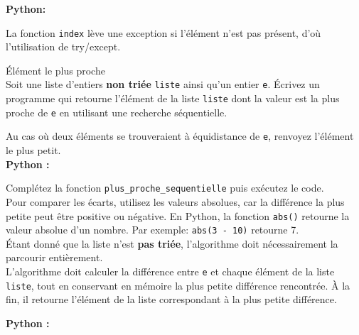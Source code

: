 \begin{Exercice}[20 minutes] [Python]
    \begin{solution}
        \textbf{Python:}
        
        La fonction \lstinline[language=python]|index| lève une exception si l'élément n'est pas présent, d'où l'utilisation de try/except.
    \end{solution}
    
    \end{Exercice}
    
    \begin{Exercice}[10 minutes] [Python] Élément le plus proche \\
    
    Soit une liste d'entiers \textbf{non triée} \texttt{liste} ainsi qu'un entier \texttt{e}. Écrivez un programme qui retourne l'élément de la liste \lstinline{liste} dont la valeur est la plus proche de \texttt{e} en utilisant une recherche séquentielle.\\
    \begin{exemple}
        
    \end{exemple}
    Au cas où deux éléments se trouveraient à équidistance de \lstinline{e}, renvoyez l'élément le plus petit.\\
    
    \textbf{Python :}
        
        \begin{conseil}
        Complétez la fonction \texttt{plus\_proche\_sequentielle} puis exécutez le code. \\

        Pour comparer les écarts, utilisez les valeurs absolues, car la différence la plus petite peut être positive ou négative. En Python, la fonction \lstinline{abs()} retourne la valeur absolue d'un nombre. Par exemple: \lstinline{abs(3 - 10)} retourne 7.\\

        Étant donné que la liste n'est \textbf{pas triée}, l'algorithme doit nécessairement la parcourir entièrement. \\

        L'algorithme doit calculer la différence entre \texttt{e} et chaque élément de la liste \texttt{liste}, tout en conservant en mémoire la plus petite différence rencontrée. À la fin, il retourne l'élément de la liste correspondant à la plus petite différence.
        \end{conseil}
        
        \begin{solution}
        \textbf{Python :}
            
        \end{solution}
        
    \end{Exercice}
    
